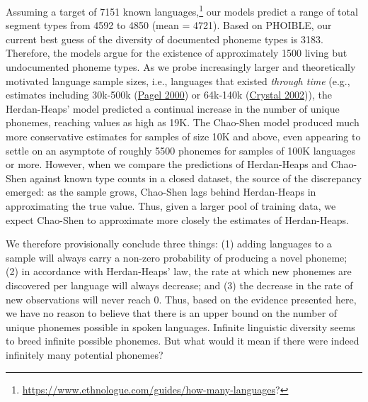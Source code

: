 \documentclass[
]{article}
\begin{document}
Assuming a target of 7151 known languages,\footnote{\url{https://www.ethnologue.com/guides/how-many-languages}?}
our models predict a range of total segment types from 4592 to 4850
(mean = 4721). Based on PHOIBLE, our current best guess of the diversity
of documented phoneme types is 3183. Therefore, the models argue for the
existence of approximately 1500 living but undocumented phoneme types.
As we probe increasingly larger and theoretically motivated language
sample sizes, i.e., languages that existed \emph{through time} (e.g.,
estimates including 30k-500k (\protect\hyperlink{ref-Pagel2000}{Pagel
2000}) or 64k-140k (\protect\hyperlink{ref-Crystal2002}{Crystal 2002})),
the Herdan-Heaps' model predicted a continual increase in the number of
unique phonemes, reaching values as high as 19K. The Chao-Shen model
produced much more conservative estimates for samples of size 10K and
above, even appearing to settle on an asymptote of roughly 5500 phonemes
for samples of 100K languages or more. However, when we compare the
predictions of Herdan-Heaps and Chao-Shen against known type counts in a
closed dataset, the source of the discrepancy emerged: as the sample
grows, Chao-Shen lags behind Herdan-Heaps in approximating the true
value. Thus, given a larger pool of training data, we expect Chao-Shen
to approximate more closely the estimates of Herdan-Heaps.

We therefore provisionally conclude three things: (1) adding languages
to a sample will always carry a non-zero probability of producing a
novel phoneme; (2) in accordance with Herdan-Heaps' law, the rate at
which new phonemes are discovered per language will always decrease; and
(3) the decrease in the rate of new observations will never reach 0.
Thus, based on the evidence presented here, we have no reason to believe
that there is an upper bound on the number of unique phonemes possible
in spoken languages. Infinite linguistic diversity seems to breed
infinite possible phonemes. But what would it mean if there were indeed
infinitely many potential phonemes?
\end{document}
